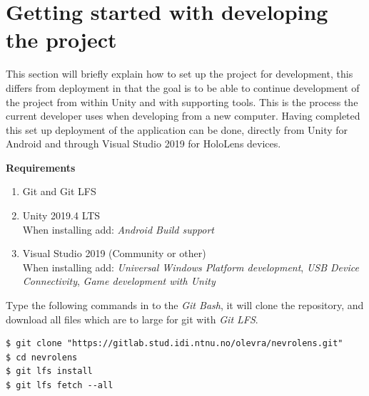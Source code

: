 \section[Project Setup]{Getting started with developing the project}
This section will briefly explain how to set up the project for development, this differs from deployment in that the goal is to be able to continue development of the project from within Unity and with supporting tools. This is the process the current developer uses when developing from a new computer.
Having completed this set up deployment of the application can be done, directly from Unity for Android and through Visual Studio 2019 for HoloLens devices.


\textbf{Requirements}
\begin{enumerate}
    \item Git and Git LFS
    \item { Unity 2019.4 LTS \\
    When installing add: \textit{Android Build support} }
    \item {Visual Studio 2019 (Community or other)\\
    When installing add: \textit{Universal Windows Platform development}, \textit{USB Device Connectivity}, \textit{Game development with Unity} }
\end{enumerate}

Type the following commands in to the \textit{Git Bash}, it will clone the repository, and download all files which are to large for git with \textit{Git LFS}.
\begin{lstlisting}[numbers=none]
$ git clone "https://gitlab.stud.idi.ntnu.no/olevra/nevrolens.git"
$ cd nevrolens
$ git lfs install
$ git lfs fetch --all
\end{lstlisting}


